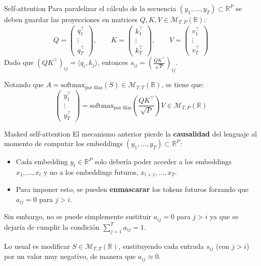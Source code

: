\documentclass{beamer}
\newcommand{\R}{\mathbb{R}}
\begin{document}
\begin{frame}{Self-attention}
    Para paralelizar el cálculo de la secuencia $(y_1,\ldots,y_T)\subset\R^P$ se deben guardar las proyecciones en matrices $Q,K,V\in \mathcal{M}_{T,P}(\R)$:
    \begin{equation*}
        Q=\left(
        \begin{matrix}
            q_1^\top \\
            \vdots   \\
            q_T^\top
        \end{matrix}
        \right),
        \qquad
        K=\left(
        \begin{matrix}
            k_1^\top \\
            \vdots   \\
            k_T^\top
        \end{matrix}
        \right),
        \qquad
        V=\left(
        \begin{matrix}
            v_1^\top \\
            \vdots   \\
            v_T^\top
        \end{matrix}
        \right)
    \end{equation*}
    Dado que $(QK^\top)_{ij}= \langle q_i,k_j\rangle$, entonces $s_{ij}=\left(\frac{QK^\top}{\sqrt{P}}\right)_{ij}$.

    Notando que $A=\text{softmax}_\text{por filas}\left(S\right)\in\mathcal{M}_{T,T}(\R)$, se tiene que:
    \begin{equation*}
        \left(
        \begin{matrix}
                y_1^\top \\
                \vdots   \\
                y_T^\top
            \end{matrix}
        \right)=\text{softmax}_\text{por filas}\left(\frac{QK^\top}{\sqrt{P}}\right)V
        \in\mathcal{M}_{T,P}(\R)
    \end{equation*}
\end{frame}

\begin{frame}{Masked self-attention}
    El mecanismo anterior pierde la \textbf{causalidad} del lenguaje al momento de computar los embeddings $(y_1,\ldots,y_T)\subset\R^P$:
    \begin{itemize}
        \item Cada embedding $y_t\in\R^P$ solo debería poder acceder a los embeddings $x_1,\ldots,x_t$ y no a los embeddings futuros, $x_{t+1},\ldots,x_T$.
        \item Para imponer esto, se pueden \textbf{enmascarar} los tokens futuros forzando que $a_{ij}=0$ para $j>i$.
    \end{itemize}
    Sin embargo, no se puede simplemente sustituir $a_{ij}=0$ para $j>i$ ya que se dejaría de cumplir la condición $\sum_{j=1}^T a_{ij}=1$.

    Lo usual es modificar $S\in\mathcal{M}_{T,T}(\R)$, sustituyendo cada entrada $s_{ij}$ (con $j>i$) por un valor muy negativo, de manera que $a_{ij}\approx 0$.
\end{frame}
\end{document}
